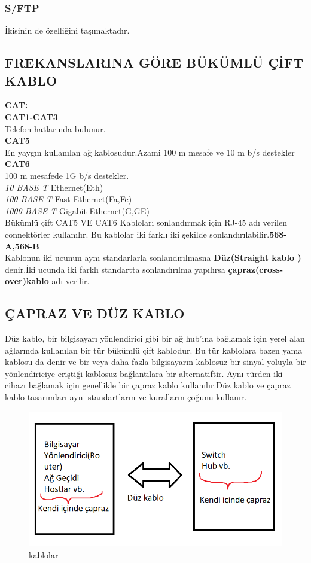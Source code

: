 \subsubsection {S/FTP }
İkisinin de özelliğini taşımaktadır.
    
\subsection{FREKANSLARINA GÖRE BÜKÜMLÜ ÇİFT KABLO}
\textbf{CAT:}\\
\textbf{CAT1-CAT3} \\
Telefon hatlarında bulunur.\\
\textbf{CAT5} \\
En yaygın kullanılan ağ kablosudur.Azami 100 m mesafe ve 10 m b/s destekler\\
\textbf{CAT6} \\
100 m mesafede 1G b/s destekler.\\
\textit{10 BASE T} Ethernet(Eth)\\
\textit{100 BASE T} Fast Ethernet(Fa,Fe)\\
\textit{1000 BASE T} Gigabit Ethernet(G,GE)\\
Bükümlü çift CAT5 VE CAT6 Kabloları  sonlandırmak için RJ-45 adı verilen connektörler kullanılır.
Bu kablolar iki farklı iki şekilde sonlandırılabilir.\textbf{568-A,568-B}\\
Kablonun iki ucunun aynı standarlarla sonlandırılmasna \textbf{Düz(Straight kablo )} denir.İki ucunda iki farklı standartta sonlandırılma yapılırsa \textbf{çapraz(cross-over)kablo } adı verilir.
\subsection{ÇAPRAZ VE DÜZ KABLO}
Düz kablo, bir bilgisayarı yönlendirici gibi bir ağ hub'ına bağlamak için yerel alan ağlarında kullanılan bir tür bükümlü çift kablodur. Bu tür kablolara bazen yama kablosu da denir ve bir veya daha fazla bilgisayarın kablosuz bir sinyal yoluyla bir yönlendiriciye eriştiği kablosuz bağlantılara bir alternatiftir.
Aynı türden iki cihazı bağlamak için genellikle bir çapraz kablo kullanılır.Düz kablo ve çapraz kablo tasarımları aynı standartların ve kuralların çoğunu kullanır.

\begin{figure}[!ht]
  \includegraphics{images/caprazduzz}
 \caption{kablolar}
 \label{fig:caprazduz_kablo}
\end{figure}


